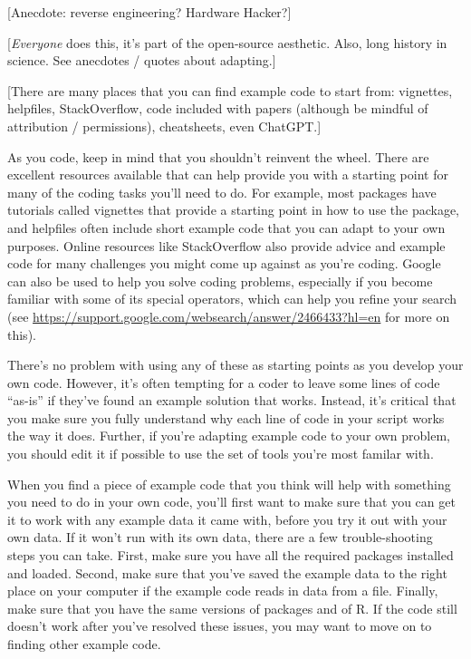 \documentclass[]{tufte-book}
\begin{document}
{[}Anecdote: reverse engineering? Hardware Hacker?{]}

{[}\emph{Everyone} does this, it's part of the open-source aesthetic. Also, long
history in science. See anecdotes / quotes about adapting.{]}

{[}There are many places that you can find example code to start from:
vignettes, helpfiles, StackOverflow, code included with papers (although
be mindful of attribution / permissions), cheatsheets, even ChatGPT.{]}

As you code, keep in mind that you shouldn't reinvent the wheel. There are
excellent resources available that can help provide you with a starting
point for many of the coding tasks you'll need to do. For example, most
packages have tutorials called vignettes that provide a starting point
in how to use the package, and helpfiles often include short example code
that you can adapt to your own purposes. Online resources like StackOverflow
also provide advice and example code for many challenges you might come up
against as you're coding. Google can also be used to help you solve coding
problems, especially if you become familiar with some of its special
operators, which can help you refine your search (see \url{https://support.google.com/websearch/answer/2466433?hl=en} for more on this).

There's no problem with using any of these as starting points as you develop
your own code. However, it's often tempting for a coder to leave some lines
of code ``as-is'' if they've found an example solution that works. Instead, it's
critical that you make sure you fully understand why each line of code in your
script works the way it does. Further, if you're adapting example code to
your own problem, you should edit it if possible to use the set of tools you're
most familar with.

When you find a piece of example code that you think will help with something
you need to do in your own code, you'll first want to make sure that you can
get it to work with any example data it came with, before you try it out with
your own data. If it won't run with its own data, there are a few trouble-shooting
steps you can take. First, make sure you have all the required packages
installed and loaded. Second, make sure that you've saved the example data
to the right place on your computer if the example code reads in data from
a file. Finally, make sure that you have the same versions of
packages and of R. If the code still doesn't work after you've resolved these
issues, you may want to move on to finding other example code.
\end{document}
